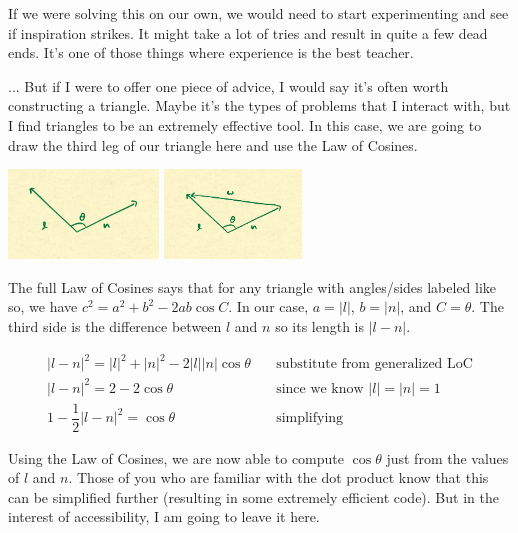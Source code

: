 \documentclass{article}
\begin{document}
If we were solving this on our own, we would need to start experimenting and see if inspiration strikes.
It might take a lot of tries and result in quite a few dead ends.
It's one of those things where experience is the best teacher.

... But if I were to offer one piece of advice, I would say it's often worth constructing a triangle.
Maybe it's the types of problems that I interact with, but I find triangles to be an extremely effective tool.
In this case, we are going to draw the third leg of our triangle here and use the Law of Cosines.

\begin{center}
	\includegraphics[width=0.3\textwidth,frame]{assets/ln.jpg}
	\hspace{0.2\textwidth}
	\includegraphics[width=0.2735\textwidth,frame]{assets/lnw.jpg}
\end{center}

The full Law of Cosines says that for any triangle with angles/sides labeled like so, we have $c^2 = a^2 + b^2 - 2ab \cos C$.
In our case, $a = |l|$, $b = |n|$, and $C = \theta$.
The third side is the difference between $l$ and $n$ so its length is $| l - n |$.

\begin{align*}
|l-n|^2 = |l|^2 + |n|^2 - 2 |l| |n| \cos \theta & \quad \text{substitute from generalized LoC} \\
|l-n|^2 = 2 - 2 \cos \theta & \quad \text{since we know } |l| = |n| = 1 \\
1 - \dfrac{1}{2}|l-n|^2 = \cos \theta & \quad \text{simplifying}
\end{align*}

Using the Law of Cosines, we are now able to compute $\cos \theta$ just from the values of $l$ and $n$.
Those of you who are familiar with the dot product know that this can be simplified further (resulting in some extremely efficient code).
But in the interest of accessibility, I am going to leave it here.
\end{document}
